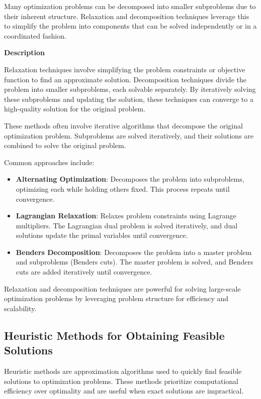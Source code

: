 \documentclass[12pt]{book} %
\begin{document}
Many optimization problems can be decomposed into smaller subproblems due to their inherent structure. Relaxation and decomposition techniques leverage this to simplify the problem into components that can be solved independently or in a coordinated fashion.

\textbf{Description}

Relaxation techniques involve simplifying the problem constraints or objective function to find an approximate solution. Decomposition techniques divide the problem into smaller subproblems, each solvable separately. By iteratively solving these subproblems and updating the solution, these techniques can converge to a high-quality solution for the original problem.

These methods often involve iterative algorithms that decompose the original optimization problem. Subproblems are solved iteratively, and their solutions are combined to solve the original problem.

Common approaches include:

\begin{itemize}
    \item \textbf{Alternating Optimization}: Decomposes the problem into subproblems, optimizing each while holding others fixed. This process repeats until convergence.
    \item \textbf{Lagrangian Relaxation}: Relaxes problem constraints using Lagrange multipliers. The Lagrangian dual problem is solved iteratively, and dual solutions update the primal variables until convergence.
    \item \textbf{Benders Decomposition}: Decomposes the problem into a master problem and subproblems (Benders cuts). The master problem is solved, and Benders cuts are added iteratively until convergence.
\end{itemize}

Relaxation and decomposition techniques are powerful for solving large-scale optimization problems by leveraging problem structure for efficiency and scalability.

\subsection{Heuristic Methods for Obtaining Feasible Solutions}

Heuristic methods are approximation algorithms used to quickly find feasible solutions to optimization problems. These methods prioritize computational efficiency over optimality and are useful when exact solutions are impractical.
\end{document}
